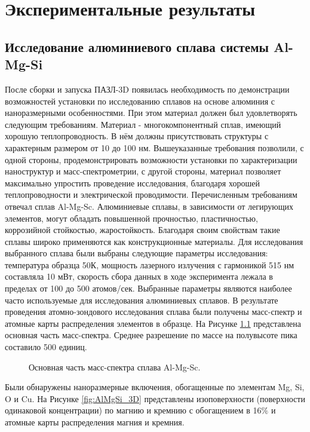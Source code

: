 \chapter{Экспериментальные результаты}\label{ch:ch4}

\section{Исследование алюминиевого сплава системы Al-Mg-Si}\label{sec:ch4/sect1}

После сборки и запуска ПАЗЛ-3D появилась необходимость по демонстрации возможностей установки по исследованию сплавов на основе алюминия  с наноразмерными особенностями. При этом материал должен был удовлетворять следующим требованиям. Материал - многокомпонентный сплав, имеющий хорошую теплопроводность. В нём должны присутствовать структуры с характерным размером от 10 до 100 нм. Вышеуказанные требования позволили, с одной стороны, продемонстрировать возможности установки по характеризации наноструктур и масс-спектрометрии, с другой стороны, материал позволяет максимально упростить проведение исследования, благодаря хорошей теплопроводности и электрической проводимости. Перечисленным требованиям отвечал сплав Al-Mg-Sc. Алюминиевые сплавы, в зависимости от легирующих элементов, могут обладать повышенной прочностью, пластичностью, коррозийной стойкостью, жаростойкость. Благодаря своим свойствам такие сплавы широко применяются как конструкционные материалы.
Для исследования выбранного сплава были выбраны следующие параметры исследования: температура образца 50К, мощность лазерного излучения с гармоникой 515 нм составляла 10 мВт, скорость сбора данных в ходе эксперимента лежала в пределах от 100 до 500 атомов/сек. Выбранные параметры являются наиболее часто используемые для исследования алюминиевых сплавов.
В результате проведения атомно-зондового исследования сплава были получены масс-спектр и атомные карты распределения элементов в образце. На Рисунке \cref{fig:AlMgSi_mass} представлена основная часть масс-спектра. Среднее разрешение по массе на полувысоте пика составило 500 единиц.

\begin{figure}[ht]
	\caption{Основная часть масс-спектра сплава Al-Mg-Sc.}
	\label{fig:AlMgSi_mass}
\end{figure} 

Были обнаружены наноразмерные включения, обогащенные по элементам Mg, Si, O и Cu. На Рисунке \cref{fig:AlMgSi_3D} представлены изоповерхности (поверхности одинаковой концентрации) по магнию и кремнию с обогащением в 16$\%$ и атомные карты распределения магния и кремния.

